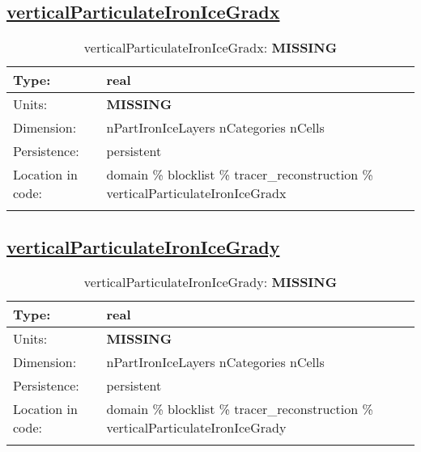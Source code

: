 \subsection[verticalParticulateIronIceGradx]{\hyperref[sec:var_tab_tracer_reconstruction]{verticalParticulateIronIceGradx}}
\label{subsec:var_sec_tracer_reconstruction_verticalParticulateIronIceGradx}
\begin{center}
\begin{longtable}{| p{2.0in} | p{4.0in} |}
        \hline 
        Type: & real \\
        \hline 
        Units: & {\bf \color{red} MISSING} \\
        \hline 
        Dimension: & nPartIronIceLayers nCategories nCells \\
        \hline 
        Persistence: & persistent \\
        \hline 
         Location in code: & domain \% blocklist \% tracer\_reconstruction \% verticalParticulateIronIceGradx \\
         \hline 
    \caption{verticalParticulateIronIceGradx: {\bf \color{red} MISSING}}
\end{longtable}
\end{center}
\subsection[verticalParticulateIronIceGrady]{\hyperref[sec:var_tab_tracer_reconstruction]{verticalParticulateIronIceGrady}}
\label{subsec:var_sec_tracer_reconstruction_verticalParticulateIronIceGrady}
\begin{center}
\begin{longtable}{| p{2.0in} | p{4.0in} |}
        \hline 
        Type: & real \\
        \hline 
        Units: & {\bf \color{red} MISSING} \\
        \hline 
        Dimension: & nPartIronIceLayers nCategories nCells \\
        \hline 
        Persistence: & persistent \\
        \hline 
         Location in code: & domain \% blocklist \% tracer\_reconstruction \% verticalParticulateIronIceGrady \\
         \hline 
    \caption{verticalParticulateIronIceGrady: {\bf \color{red} MISSING}}
\end{longtable}
\end{center}

